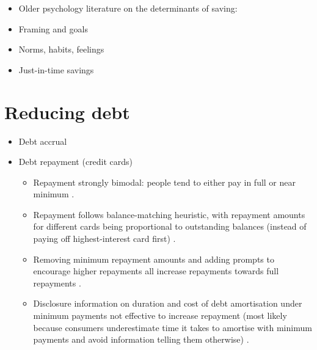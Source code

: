 \documentclass[a4paper, 11pt]{report}
\begin{document}
\begin{itemize}
\begin{itemize}
		\item \citet{madrian2001power}
	\end{itemize}

	\item Older psychology literature on the determinants of saving: \citet{lunt1991psychological,warneryd1989psychology}

	\item Framing and goals
	\item Norms, habits, feelings
	\item Just-in-time savings
\end{itemize}


\section{Reducing debt}

\begin{itemize}
	\item Debt accrual
	\item Debt repayment (credit cards)
	\begin{itemize}
		\item Repayment strongly bimodal: people tend to either pay in full or near minimum \citep{wang2014perverse}.

		\item Repayment follows balance-matching heuristic, with repayment amounts for different cards being proportional to outstanding balances (instead of paying off highest-interest card first) \citep{gathergood2019individuals}.

		\item Removing minimum repayment amounts and adding prompts to encourage higher repayments all increase repayments towards full repayments \citep{adams2018increasing, stewart2009cost}.

		\item Disclosure information on duration and cost of debt amortisation under minimum payments not effective to increase repayment (most likely because consumers underestimate time it takes to amortise with minimum payments and avoid information telling them otherwise) \citep{adams2018conflict}.
	\end{itemize}
\end{itemize}

\end{document}
